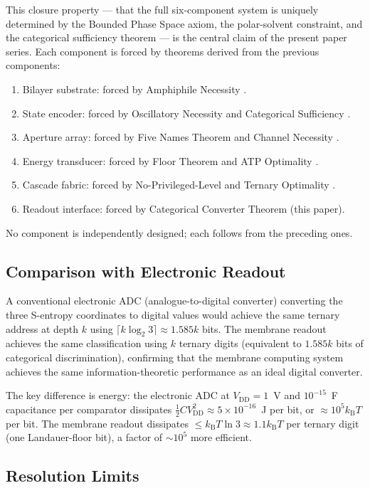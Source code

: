 \documentclass[11pt,twocolumn,a4paper]{article}
\theoremstyle{definition}
\theoremstyle{remark}
\newcommand{\kB}{k_{\mathrm{B}}}
\begin{document}
This closure property --- that the full six-component system is uniquely determined
by the Bounded Phase Space axiom, the polar-solvent constraint, and the
categorical sufficiency theorem --- is the central claim of the present paper
series. Each component is forced by theorems derived from the previous components:
\begin{enumerate}[nosep]
\item Bilayer substrate: forced by Amphiphile Necessity \citep{companion1}.
\item State encoder: forced by Oscillatory Necessity and Categorical Sufficiency
  \citep{companion2}.
\item Aperture array: forced by Five Names Theorem and Channel Necessity \citep{companion3}.
\item Energy transducer: forced by Floor Theorem and ATP Optimality \citep{companion4}.
\item Cascade fabric: forced by No-Privileged-Level and Ternary Optimality \citep{companion5}.
\item Readout interface: forced by Categorical Converter Theorem (this paper).
\end{enumerate}
No component is independently designed; each follows from the preceding ones.

\subsection{Comparison with Electronic Readout}

A conventional electronic ADC (analogue-to-digital converter) converting the
three S-entropy coordinates to digital values would achieve the same ternary
address at depth $k$ using $\lceil k \log_2 3 \rceil \approx 1.585 k$ bits.
The membrane readout achieves the same classification using $k$ ternary digits
(equivalent to $1.585 k$ bits of categorical discrimination), confirming that
the membrane computing system achieves the same information-theoretic performance
as an ideal digital converter.

The key difference is energy: the electronic ADC at $V_{\mathrm{DD}} = 1$~V and
$10^{-15}$~F capacitance per comparator dissipates $\frac{1}{2} C V_{\mathrm{DD}}^2
\approx 5 \times 10^{-16}$~J per bit, or $\approx 10^5 \kB T$ per bit.
The membrane readout dissipates $\leq \kB T \ln 3 \approx 1.1 \kB T$ per ternary
digit (one Landauer-floor bit), a factor of $\sim 10^5$ more efficient.

\subsection{Resolution Limits}
\end{document}
